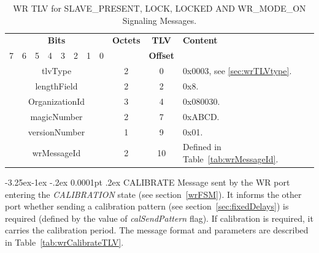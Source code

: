 \documentclass[a4paper, 12pt]{article}
\makeatletter
\renewcommand\paragraph{\@startsection{paragraph}{4}{\z@}%
                                     {-3.25ex\@plus -1ex \@minus -.2ex}%
                                     {0.0001pt \@plus .2ex}%
                                     {\normalfont\normalsize\bfseries}}
\makeatother
\begin{document}
\begin{table}[h!]
\caption{WR TLV for SLAVE\_PRESENT, LOCK, LOCKED AND WR\_MODE\_ON Signaling Messages.}
\centering
\begin{tabular}{| c | c | c | c | c | c | c | c | c | c | p{4.5cm} |}
\hline
\multicolumn{8}{|c|}{\textbf{Bits}} & \textbf{Octets} & \textbf{TLV}  & \textbf{Content} \\
\cline{0-7}
7 & 6 & 5 & 4 & 3 & 2 & 1 & 0 &     & \textbf{Offset}  &  \\
\hline
\multicolumn{8}{|c|}{tlvType       }  & 2  & 0  & 0x0003, see \ref{sec:wrTLVtype}. \\ \hline
\multicolumn{8}{|c|}{lengthField   }  & 2  & 2  & 0x8.   \\ \hline
\multicolumn{8}{|c|}{OrganizationId}  & 3  & 4  & 0x080030.               \\ \hline
\multicolumn{8}{|c|}{magicNumber   }  & 2  & 7  & 0xABCD.               \\ \hline
\multicolumn{8}{|c|}{versionNumber }  & 1  & 9  & 0x01.               \\ \hline
\multicolumn{8}{|c|}{wrMessageId   }  & 2  & 10 & Defined in Table~\ref{tab:wrMessageId}.\\ \hline
\end{tabular}
\label{tab:wrOtherTLV}
\end{table}



\paragraph{CALIBRATE}
\label{par:CALIBRATE}
Message sent by the WR port entering the \textit{CALIBRATION} state  (see
section~\ref{wrFSM}). It informs the other port 
whether sending a calibration pattern (see section~\ref{sec:fixedDelays}) is required (defined by
the value of \textit{calSendPattern} flag). If calibration is required, it carries  
the calibration period. The message format and parameters are described  in
Table~\ref{tab:wrCalibrateTLV}.
\end{document}
